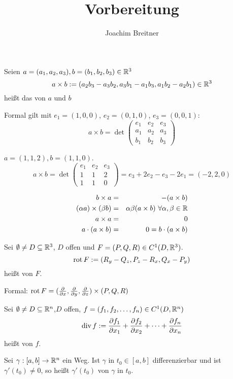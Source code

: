 \documentclass{article}
\title{Vorbereitung}
\author{Joachim Breitner}
\begin{document}
\maketitle

\begin{definition}
Seien $a=(a_1,a_2,a_3), b=(b_1,b_2,b_3) \in \mathbb{R}^3$
\[ a\times b := (a_2b_3 - a_3b_2, a_3b_1 - a_1b_3, a_1b_2-a_2b_1) \in \mathbb{R}^3 \]
heißt das  von $a$ und $b$

Formal gilt mit $e_1=(1,0,0)$, $e_2=(0,1,0)$, $e_3=(0,0,1)$:
\[ a\times b = \det \begin{pmatrix} e_1 & e_2 & e_3 \\ a_1 & a_2 & a_3 \\ b_1 & b_2 & b_3 \end{pmatrix} \]
\end{definition}

\begin{beispiel}
$a = (1,1,2), b=(1,1,0)$. 
\[ a \times b  = \det \begin{pmatrix} e_1 & e_2 & e_3 \\ 1 & 1 & 2 \\ 1 & 1 & 0 \end{pmatrix} = e_3 + 2e_2 - e_3 -2e_1 = (-2,2,0) \]
\end{beispiel}

\begin{bemerkung}[Regeln]
\begin{eqnarray*}
b\times a &=& - (a\times b) \\
(\alpha a) \times (\beta b) &=& \alpha\beta (a\times b) \ \forall \alpha, \beta \in\MdR \\
a \times a &=& 0 \\
a \cdot (a\times b) &= & 0 = b \cdot (a\times b)
\end{eqnarray*}
\end{bemerkung}

\begin{definition}
Sei $\emptyset \ne D \subseteq \mathbb{R}^3$, $D$ offen und $F=(P,Q,R)\in C^1(D,\mathbb{R}^3)$.
\[ \mathop{\rm rot}\nolimits F := (R_y - Q_z , P_z - R_x, Q_x-P_y) \]
heißt  von $F$.

Formal: $\mathop{\rm rot}\nolimits F = (\frac\partial{\partial x}, \frac\partial{\partial y}, \frac\partial{\partial z})\times(P,Q,R) $
\end{definition}

\begin{definition}
Sei $\emptyset \ne D \subseteq \mathbb{R}^n$,$D$ offen, $f=(f_1,f_2,\ldots,f_n)\in C^1(D,\mathbb{R}^n)$
\[ \mathop{\rm div}\nolimits f := \frac{\partial f_1}{\partial x_1} + \frac{\partial f_2}{\partial x_2} + \cdots + \frac{\partial f_n}{\partial x_n} \]
heißt  von $f$.
\end{definition}

\begin{definition}
Sei $\gamma : [a,b] \to \mathbb{R}^n$ ein Weg. Ist $\gamma$ in $t_0\in[a,b]$ differenzierbar und ist $\gamma'(t_0) \ne 0$, so heißt $\gamma'(t_0)$  von $\gamma$ in $t_0$.
\end{definition}
\end{document}
